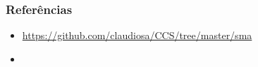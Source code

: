 \documentclass[10pt]{beamer}
\begin{document}

\begin{frame}
    \frametitle{Referências}
    \begin{itemize}
     \item \url{https://github.com/claudiosa/CCS/tree/master/sma}
     \item \url{}
    \end{itemize}
\end{frame}

\end{document}
